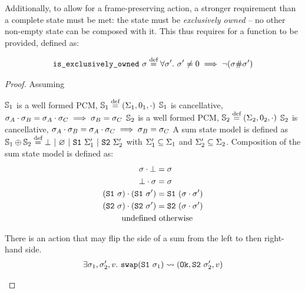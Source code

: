 Additionally, to allow for a frame-preserving \swap{} action, a stronger requirement than a complete state must be met: the state must be \textit{exclusively owned} -- no other non-empty state can be composed with it. This thus requires for a  function to be provided, defined as:

\newcommand{\isexowned}[0]{\code{is\_exclusively\_owned}~}
\begin{align*}
	\isexowned\st \defeq \forall\st'.~\st'\neq0\implies\neg(\st\#\st')
\end{align*}


\begin{proof}

Assuming 
\begin{hypvlist}
 $\mathbb S_1$ is a well formed PCM, $\mathbb S_1 \stackrel{\textnormal{def}}= (\Sigma_1, 0_1, \cdot)$
 $\mathbb S_1$ is cancellative, $\sigma_A \cdot \sigma_B = \sigma_A \cdot \sigma_C \implies \sigma_B = \sigma_C$
 $\mathbb S_2$ is a well formed PCM, $\mathbb S_2 \stackrel{\textnormal{def}}= (\Sigma_2, 0_2, \cdot)$
 $\mathbb S_2$ is cancellative, $\sigma_A \cdot \sigma_B = \sigma_A \cdot \sigma_C \implies \sigma_B = \sigma_C$
 A sum state model is defined as $\mathbb S_1\oplus\mathbb S_2 \stackrel{\textnormal{def}}= \bot ~|~ \varnothing ~|~ \texttt{S1}~ \Sigma_1' ~|~ \texttt{S2}~ \Sigma_2'$ with $\Sigma_1'\subseteq \Sigma_1$ and $\Sigma_2'\subseteq \Sigma_2$.
 Composition of the sum state model is defined as:
	\begin{align*}
		\sigma \cdot \bot &= \sigma\\
		\bot \cdot \sigma &= \sigma\\
		(\texttt{S1}~\sigma) \cdot (\texttt{S1}~\sigma') &= \texttt{S1}~(\sigma\cdot\sigma')\\
		(\texttt{S2}~\sigma) \cdot (\texttt{S2}~\sigma') &= \texttt{S2}~(\sigma\cdot\sigma')\\
		\text{undefined}&\text{ otherwise}
	\end{align*}

 There is an action \swap{} that may flip the side of a sum from the left to then right-hand side.
	\begin{align*}
		\exists\sigma_1,\sigma_2',v.~\texttt{swap}(\texttt{S1}~\sigma_1)\rightsquigarrow(\texttt{Ok},\texttt{S2}~\sigma_2',v)
	\end{align*}
	
\end{hypvlist}


\end{proof}
